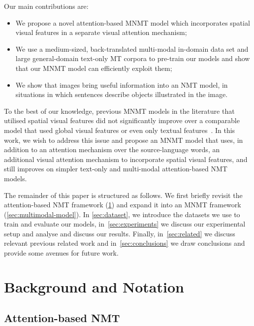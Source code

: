 \documentclass[11pt]{article}
\begin{document}
Our main contributions are:
\begin{itemize}
 \setlength\itemsep{0em}
 \item We propose a novel attention-based MNMT model which incorporates spatial visual features in a separate visual attention mechanism;
 
 \item We use a medium-sized, back-translated multi-modal in-domain data set and large general-domain text-only MT corpora to pre-train our models and show that our MNMT model can efficiently exploit them;
 
 \item We show that images bring useful information into an NMT model, in situations in which sentences describe objects illustrated in the image.
\end{itemize}


To the best of our knowledge, previous MNMT models in the literature that utilised spatial visual features did not significantly improve over a comparable model that used global visual features or even only textual features~\cite{Caglayanetal2016,CalixtoElliottFrank2016,Huangetal2016,Libovickyetal2016,Speciaetal2016}.
In this work, we wish to address this issue and propose an MNMT model that uses, in addition to an attention mechanism over the source-language words, an additional visual attention mechanism to incorporate spatial visual features, and still improves on simpler text-only and multi-modal attention-based NMT models.

The remainder of this paper is structured as follows.
We first briefly revisit the attention-based NMT framework (\cref{sec:background}) and expand it into an MNMT framework (\cref{sec:multimodal-model}).
In \cref{sec:dataset}, we introduce the datasets we use to train and evaluate our models,
in~\cref{sec:experiments} we discuss our experimental setup and analyse and discuss our results.
Finally, in~\cref{sec:related} we discuss relevant previous related work and in~\cref{sec:conclusions} we draw conclusions and provide some avenues for future work.




\section{Background and Notation}
\label{sec:background}

\subsection{Attention-based NMT}\label{sec:model}
\end{document}
